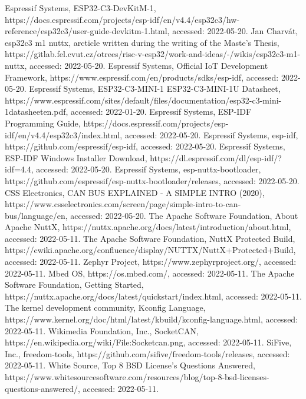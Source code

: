 \documentclass{ctuthesis}
\begin{document}
\begin{thebibliography}{1}
 Espressif Systems, ESP32-C3-DevKitM-1, https://docs.espressif.com/projects/esp-idf/en/v4.4/esp32c3/hw-reference/esp32c3/user-guide-devkitm-1.html, accessed: 2022-05-20.
 Jan Charvát, esp32c3 m1 nuttx, arcticle written during the writing of the Maste's Thesis, https://gitlab.fel.cvut.cz/otrees/risc-v-esp32/work-and-ideas/-/wikis/esp32c3-m1-nuttx, accessed: 2022-05-20.
 Espressif Systems, Official IoT Development Framework, https://www.espressif.com/en/products/sdks/esp-idf, accessed: 2022-05-20.
 Espressif Systems, ESP32-C3-MINI-1 ESP32-C3-MINI-1U Datasheet, https://www.espressif.com/sites/default/files/documentation/esp32-c3-mini-1\text{-}datasheet\text{-}en.pdf, accessed: 2022-01-20.
 Espressif Systems, ESP-IDF Programming Guide, https://docs.espressif.com/projects/esp-idf/en/v4.4/esp32c3/index.html, accessed: 2022-05-20.
 Espressif Systems, esp-idf, https://github.com/espressif/esp-idf, accessed: 2022-05-20.
 Espressif Systems, ESP-IDF Windows Installer Download, https://dl.espressif.com/dl/esp-idf/?idf=4.4, accessed: 2022-05-20.
 Espressif Systems, esp-nuttx-bootloader, https://github.com/espressif/esp-nuttx-bootloader/releases, accessed: 2022-05-20.
 CSS Electronics, CAN BUS EXPLAINED - A SIMPLE INTRO (2020), https://www.csselectronics.com/screen/page/simple-intro-to-can-bus/language/en, accessed: 2022-05-20.
 The Apache Software Foundation, About Apache NuttX, https://nuttx.apache.org/docs/latest/introduction/about.html, accessed: 2022-05-11.
 The Apache Software Foundation, NuttX Protected Build,  https://cwiki.apache.org/confluence/display/NUTTX/NuttX+Protected+Build, accessed: 2022-05-11.
 Zephyr Project, https://www.zephyrproject.org/, accessed: 2022-05-11.
 Mbed OS, https://os.mbed.com/, accessed: 2022-05-11.
 The Apache Software Foundation, Getting Started, https://nuttx.apache.org/docs/latest/quickstart/index.html, accessed: 2022-05-11.
 The kernel development community, Kconfig Language, https://www.kernel.org/doc/html/latest/kbuild/kconfig-language.html, accessed: 2022-05-11.
 Wikimedia Foundation, Inc., SocketCAN, https://en.wikipedia.org/wiki/File:Socketcan.png, accessed: 2022-05-11.
 SiFive, Inc., freedom-tools, https://github.com/sifive/freedom-tools/releases, accessed: 2022-05-11.
 White Source, Top 8 BSD License’s Questions Answered, https://www.whitesourcesoftware.com/resources/blog/top-8-bsd-licenses-questions-answered/, accessed: 2022-05-11.

\end{thebibliography}
\end{document}
